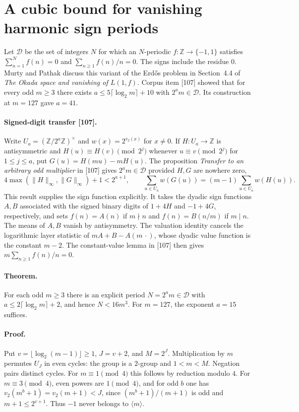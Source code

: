 \documentclass[11pt]{article}
\begin{document}
\section{A cubic bound for vanishing harmonic sign periods}

Let $\mathcal D$ be the set of integers $N$ for which an $N$-periodic
$f:\mathbb Z\to\{-1,1\}$ satisfies $\sum_{n=1}^N f(n)=0$ and
$\sum_{n\ge1}f(n)/n=0$. The signs include the residue $0$.
Murty and Pathak discuss this variant of the Erd\H{o}s problem in
Section~4.4 of \emph{The Okada space and vanishing of $L(1,f)$}.
Corpus item [107] showed that for every odd $m\ge3$ there exists
$a\le5\lceil\log_2 m\rceil+10$ with $2^a m\in\mathcal D$. Its
construction at $m=127$ gave $a=41$.

\paragraph{Signed-digit transfer [107].}
Write $U_a=(\mathbb Z/2^a\mathbb Z)^\times$ and
$w(x)=2^{v_2(x)}$ for $x\ne0$.
If $H:U_a\to\mathbb Z$ is antisymmetric and
$H(u)\equiv H(v)\pmod{2^j}$ whenever $u\equiv v\pmod{2^j}$ for
$1\le j\le a$, put $G(u)=H(mu)-mH(u)$. The proposition
\emph{Transfer to an arbitrary odd multiplier} in [107] gives $2^am\in\mathcal D$
provided $H,G$ are nowhere zero,
\[
 4\max(\|H\|_\infty,\|G\|_\infty)+1<2^{a+1},\qquad
 \sum_{u\in U_a}w(G(u))=(m-1)\sum_{u\in U_a}w(H(u)).
\]
This result supplies the sign function explicitly. It takes the dyadic
sign functions $A,B$ associated with the signed binary digits of $1+4H$ and
$-1+4G$, respectively, and sets $f(n)=A(n)$ if $m\nmid n$ and
$f(n)=B(n/m)$ if $m\mid n$. The means of $A,B$ vanish by antisymmetry.
The valuation identity cancels the logarithmic layer statistic of
$mA+B-A(m\,\cdot)$, whose dyadic value function is the constant $m-2$.
The constant-value lemma in [107] then gives
$m\sum_{n\ge1}f(n)/n=0$.

\paragraph{Theorem.}
For each odd $m\ge3$ there is an explicit period $N=2^a m\in\mathcal D$
with $a\le2\lceil\log_2m\rceil+2$, and hence $N<16m^3$.
For $m=127$, the exponent $a=15$ suffices.

\paragraph{Proof.}
Put $v=\lfloor\log_2(m-1)\rfloor\ge1$, $J=v+2$, and $M=2^J$.
Multiplication by $m$ permutes $U_J$ in even cycles: the group is
a $2$-group and $1<m<M$. Negation pairs distinct cycles.
For $m\equiv1\pmod4$ this follows by reduction modulo $4$.
For $m\equiv3\pmod4$, even powers are $1\pmod4$, and for odd $b$
one has $v_2(m^b+1)=v_2(m+1)<J$, since $(m^b+1)/(m+1)$ is odd and
$m+1\le2^{v+1}$. Thus $-1$ never belongs to $\langle m\rangle$.
\end{document}
